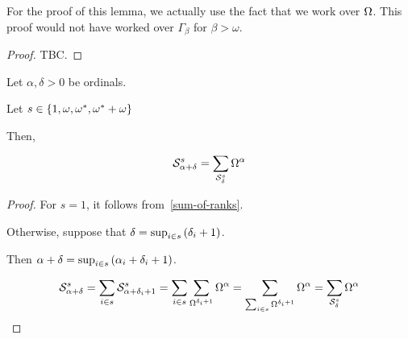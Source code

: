\begin{note}
  For the proof of this lemma, we actually use the fact that
  we work over $\Omega$. This proof would not have worked over $\Gamma_{\beta}$
  for $\beta > \omega$.
\end{note}

\begin{proof}
  TBC.
\end{proof}

\begin{corollary}
  Let $\alpha, \delta > 0$ be ordinals.

  Let $s \in \left\{ {1, \omega, \omega^\ast, \omega^\ast + \omega} \right\}$

  Then,

  \[
    \mathcal{S}^{s}_{\alpha + \delta}
    = \sum_{\mathcal{S}^{s}_{\delta}}{\Omega^{\alpha}}
  \]
\end{corollary}

\begin{proof}

  For $s = 1$, it follows from~\cref{sum-of-ranks}.

  Otherwise, suppose that $\delta = \sup_{i \in s} \left( {\delta_i + 1} \right)$.

  Then $\alpha + \delta = \sup_{i \in s} \left( {\alpha_i + \delta_i + 1} \right)$.

  \[
    \mathcal{S}^{s}_{\alpha + \delta}
    = \sum_{i \in s}{\mathcal{S}^{s}_{\alpha + \delta_i + 1}}
    = \sum_{i \in s}\sum_{\Omega^{\delta_i + 1}}{\Omega^{\alpha}}
    = \sum_{\sum_{i \in s}{\Omega^{\delta_i + 1}}}{\Omega^{\alpha}}
    = \sum_{\mathcal{S}^{s}_{\delta}}{\Omega^{\alpha}}
  \]
\end{proof}
